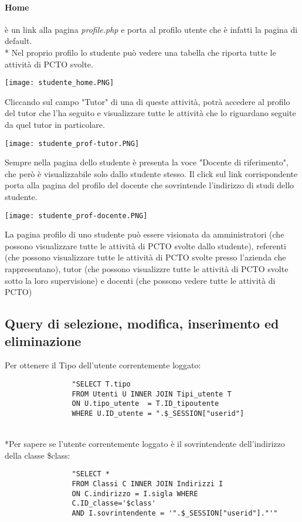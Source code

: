 \documentclass[12pt]{article}
\begin{document}
\paragraph{Home}  è un link alla pagina \textit{profile.php} e porta al profilo utente che è infatti la pagina di default.\\*
Nel proprio profilo lo studente può vedere una tabella che riporta tutte le attività di PCTO svolte.
\begin{center}
    \texttt{[image: studente\_home.PNG]}
\end{center}
Cliccando sul campo "Tutor" di una di queste attività, potrà accedere al profilo del tutor che l'ha seguito e visualizzare tutte le attività che lo riguardano seguite da quel tutor in particolare.
\begin{center}
    \texttt{[image: studente\_prof-tutor.PNG]}
\end{center}
Sempre nella pagina dello studente è presenta la voce "Docente di riferimento", che però è visualizzabile solo dallo studente stesso.
Il click sul link corrispondente porta alla pagina del profilo del docente che sovrintende l'indirizzo di studi dello studente.
\begin{center}
    \texttt{[image: studente\_prof-docente.PNG]}
\end{center}
La pagina profilo di uno studente può essere visionata da amministratori (che possono visualizzare tutte le attività di PCTO svolte dallo studente), referenti (che possono visualizzare tutte le attività di PCTO svolte presso l'azienda che rappresentano), tutor (che possono visualizzre tutte le attività di PCTO svolte sotto la loro supervisione) e docenti (che possono vedere tutte le attività di PCTO)

\newpage
\subsection{Query di selezione, modifica, inserimento ed eliminazione}
Per ottenere il Tipo dell'utente correntemente loggato:
\begin{verbatim}
                "SELECT T.tipo
                FROM Utenti U INNER JOIN Tipi_utente T 
                ON U.tipo_utente  = T.ID_tipoutente 
                WHERE U.ID_utente = ".$_SESSION["userid"]    
\end{verbatim}
\\*Per sapere se l'utente correntemente loggato è il sovrintendente dell'indirizzo della classe \$class:
\begin{verbatim}
                "SELECT * 
                FROM Classi C INNER JOIN Indirizzi I 
                ON C.indirizzo = I.sigla WHERE 
                C.ID_classe='$class' 
                AND I.sovrintendente = '".$_SESSION["userid"]."'"
\end{verbatim}
\end{document}
